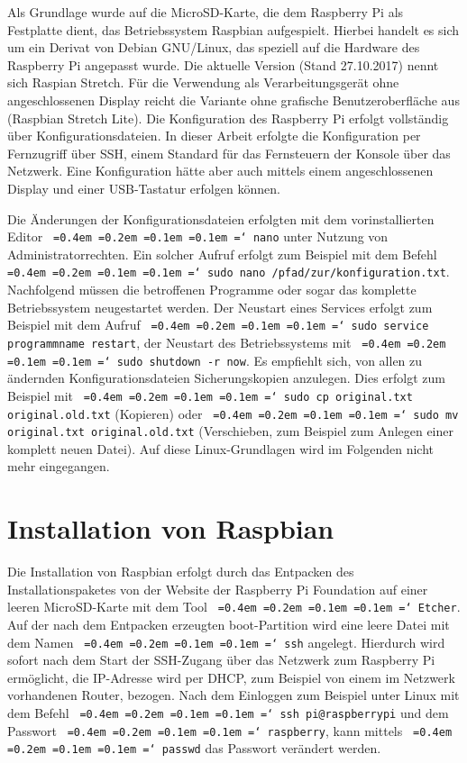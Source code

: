 \documentclass[a4paper,12pt,bibliography=totoc, listof=totoc,titlepage,pointlessnumbers]{scrreprt}
\newcommand*\justify{%
  \fontdimen2\font=0.4em%
  \fontdimen3\font=0.2em%
  \fontdimen4\font=0.1em%
  \fontdimen7\font=0.1em%
  \hyphenchar\font=`\-%
}
\newcommand{\code}[1]{\texttt{\justify{#1}}}
\begin{document}
Als Grundlage wurde auf die MicroSD-Karte, die dem Raspberry Pi als Festplatte dient, das Betriebssystem Raspbian aufgespielt. Hierbei handelt es sich um ein Derivat von Debian GNU/Linux, das speziell auf die Hardware des Raspberry Pi angepasst wurde. Die aktuelle Version (Stand 27.10.2017) nennt sich Raspian Stretch. Für die Verwendung als Verarbeitungsgerät ohne angeschlossenen Display reicht die Variante ohne grafische Benutzeroberfläche aus (Raspbian Stretch Lite). Die Konfiguration des Raspberry Pi erfolgt vollständig über Konfigurationsdateien. In dieser Arbeit erfolgte die Konfiguration per Fernzugriff über SSH, einem Standard für das Fernsteuern der Konsole über das Netzwerk. Eine Konfiguration hätte aber auch mittels einem angeschlossenen Display und einer USB-Tastatur erfolgen können.

Die Änderungen der Konfigurationsdateien erfolgten mit dem vorinstallierten Editor \code{nano} unter Nutzung von Administratorrechten. Ein solcher Aufruf erfolgt zum Beispiel mit dem Befehl \code{sudo nano /pfad/zur/konfiguration.txt}. Nachfolgend müssen die betroffenen Programme oder sogar das komplette Betriebssystem neugestartet werden. Der Neustart eines Services erfolgt zum Beispiel mit dem Aufruf \code{sudo service programmname restart}, der Neustart des Betriebssystems mit \code{sudo shutdown -r now}. Es empfiehlt sich, von allen zu ändernden Konfigurationsdateien Sicherungskopien anzulegen. Dies erfolgt zum Beispiel mit \code{sudo cp original.txt original.old.txt} (Kopieren) oder \code{sudo mv original.txt original.old.txt} (Verschieben, zum Beispiel zum Anlegen einer komplett neuen Datei). Auf diese Linux-Grundlagen wird im Folgenden nicht mehr eingegangen.

\section{Installation von Raspbian}
Die Installation von Raspbian erfolgt durch das Entpacken des Installationspaketes von der Website der Raspberry Pi Foundation auf einer leeren MicroSD-Karte mit dem Tool \code{Etcher}. Auf der nach dem Entpacken erzeugten boot-Partition wird eine leere Datei mit dem Namen \code{ssh} angelegt. Hierdurch wird sofort nach dem Start der SSH-Zugang über das Netzwerk zum Raspberry Pi ermöglicht, die IP-Adresse wird per DHCP, zum Beispiel von einem im Netzwerk vorhandenen Router, bezogen. Nach dem Einloggen zum Beispiel unter Linux mit dem Befehl \code{ssh pi@raspberrypi} und dem Passwort \code{raspberry}, kann mittels \code{passwd} das Passwort verändert werden.
\end{document}
